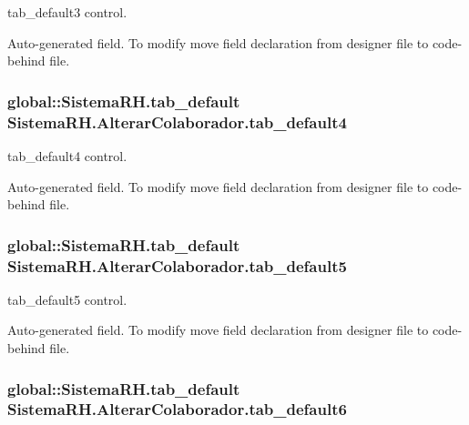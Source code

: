 tab\_\-default3 control. 

Auto-\/generated field. To modify move field declaration from designer file to code-\/behind file. \hypertarget{class_sistema_r_h_1_1_alterar_colaborador_a45f9455871319d24c84f7d6071de6d71}{
\subsubsection[{tab\_\-default4}]{\setlength{\rightskip}{0pt plus 5cm}global::SistemaRH.tab\_\-default {\bf SistemaRH.AlterarColaborador.tab\_\-default4}}}
\label{class_sistema_r_h_1_1_alterar_colaborador_a45f9455871319d24c84f7d6071de6d71}


tab\_\-default4 control. 

Auto-\/generated field. To modify move field declaration from designer file to code-\/behind file. \hypertarget{class_sistema_r_h_1_1_alterar_colaborador_a8274d1fac110f8b0c560f74f0d3b9dba}{
\subsubsection[{tab\_\-default5}]{\setlength{\rightskip}{0pt plus 5cm}global::SistemaRH.tab\_\-default {\bf SistemaRH.AlterarColaborador.tab\_\-default5}}}
\label{class_sistema_r_h_1_1_alterar_colaborador_a8274d1fac110f8b0c560f74f0d3b9dba}


tab\_\-default5 control. 

Auto-\/generated field. To modify move field declaration from designer file to code-\/behind file. \hypertarget{class_sistema_r_h_1_1_alterar_colaborador_ad7c017105136e82f938f8232de1566ed}{
\subsubsection[{tab\_\-default6}]{\setlength{\rightskip}{0pt plus 5cm}global::SistemaRH.tab\_\-default {\bf SistemaRH.AlterarColaborador.tab\_\-default6}}}
\label{class_sistema_r_h_1_1_alterar_colaborador_ad7c017105136e82f938f8232de1566ed}


